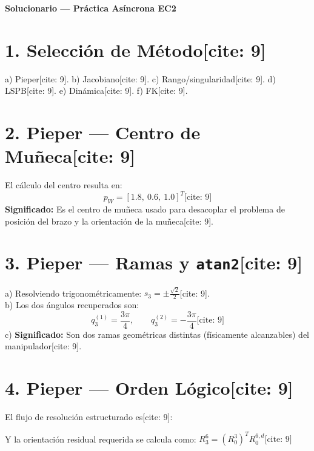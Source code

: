 \documentclass[11pt, a4paper]{article}
\begin{document}
\begin{center}
    \Large\textbf{\textcolor{red!80!black}{Solucionario — Práctica Asíncrona EC2}}\\[0.2cm]
\end{center}

\section*{1. Selección de Método[cite: 9]}
a) Pieper[cite: 9]. \quad
b) Jacobiano[cite: 9]. \quad
c) Rango/singularidad[cite: 9]. \quad
d) LSPB[cite: 9]. \quad
e) Dinámica[cite: 9]. \quad
f) FK[cite: 9].

\section*{2. Pieper — Centro de Muñeca[cite: 9]}
El cálculo del centro resulta en:
\begin{equation*}
    p_W = [1.8,\ 0.6,\ 1.0]^T \text{[cite: 9]}
\end{equation*}
\textbf{Significado:} Es el centro de muñeca usado para desacoplar el problema de posición del brazo y la orientación de la muñeca[cite: 9].

\section*{3. Pieper — Ramas y \texttt{atan2}[cite: 9]}
a) Resolviendo trigonométricamente: $s_3 = \pm\frac{\sqrt{2}}{2}$[cite: 9]. \\
b) Los dos ángulos recuperados son:
\begin{equation*}
    q_3^{(1)} = \frac{3\pi}{4}, \qquad q_3^{(2)} = -\frac{3\pi}{4} \text{[cite: 9]}
\end{equation*}
c) \textbf{Significado:} Son dos ramas geométricas distintas (físicamente alcanzables) del manipulador[cite: 9].

\section*{4. Pieper — Orden Lógico[cite: 9]}
El flujo de resolución estructurado es[cite: 9]:
\begin{center}
\end{center}
Y la orientación residual requerida se calcula como: $\boxed{ R_3^6 = (R_0^3)^T R_0^{6,d} } \text{[cite: 9]}$
\end{document}

